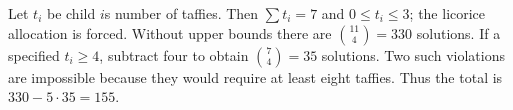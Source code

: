 Let $t_i$ be child $i$\textquotesingle s number of taffies. Then $\sum t_i=7$ and $0\le t_i\le 3$; the licorice allocation is forced. Without upper bounds there are $\binom{11}{4}=330$ solutions. If a specified $t_i\ge 4$, subtract four to obtain $\binom 74=35$ solutions. Two such violations are impossible because they would require at least eight taffies. Thus the total is $330-5\cdot 35=\boxed{155}$.
